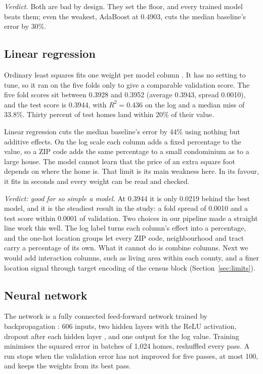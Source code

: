 \documentclass[sigconf,nonacm,10pt]{acmart}
\begin{document}
\emph{Verdict.} Both are bad by design. They set the floor, and every trained model beats them; even the weakest, AdaBoost at 0.4903, cuts the median baseline's error by 30\%.

\subsection{Linear regression}
Ordinary least squares fits one weight per model column \cite{hastie2009}. It has no setting to tune, so it ran on the five folds only to give a comparable validation score. The five fold scores sit between 0.3928 and 0.3952 (average 0.3943, spread 0.0010), and the test score is 0.3944, with $R^2 = 0.436$ on the log and a median miss of 33.8\%. Thirty percent of test homes land within 20\% of their value.

Linear regression cuts the median baseline's error by 44\% using nothing but additive effects. On the log scale each column adds a fixed percentage to the value, so a ZIP code adds the same percentage to a small condominium as to a large house. The model cannot learn that the price of an extra square foot depends on where the home is. That limit is its main weakness here. In its favour, it fits in seconds and every weight can be read and checked.

\emph{Verdict: good for so simple a model.} At 0.3944 it is only 0.0219 behind the best model, and it is the steadiest result in the study: a fold spread of 0.0010 and a test score within 0.0001 of validation. Two choices in our pipeline made a straight line work this well. The log label turns each column's effect into a percentage, and the one-hot location groups let every ZIP code, neighbourhood and tract carry a percentage of its own. What it cannot do is combine columns. Next we would add interaction columns, such as living area within each county, and a finer location signal through target encoding of the census block (Section~\ref{sec:limits}).

\subsection{Neural network}
The network is a fully connected feed-forward network trained by backpropagation \cite{rumelhart1986}: 606 inputs, two hidden layers with the ReLU activation, dropout after each hidden layer \cite{srivastava2014}, and one output for the log value. Training minimises the squared error in batches of 1,024 homes, reshuffled every pass. A run stops when the validation error has not improved for five passes, at most 100, and keeps the weights from its best pass.
\end{document}
